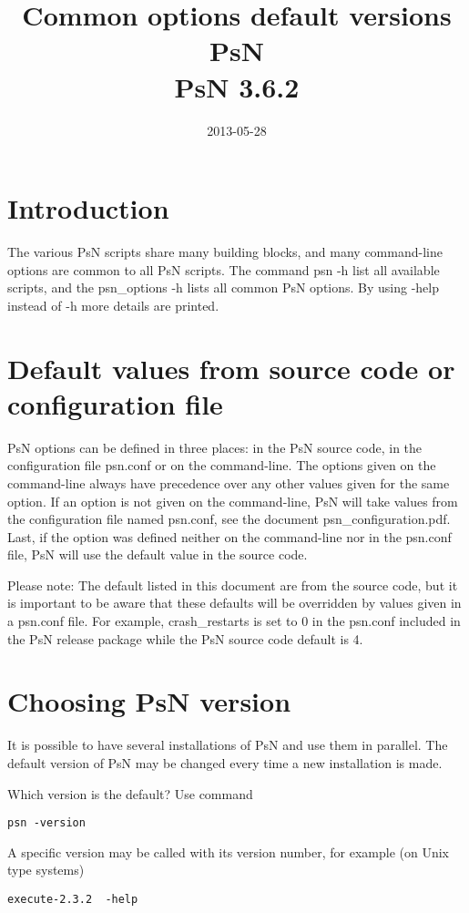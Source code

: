 \documentclass[a4paper,12pt]{article}
\title{Common options default versions PsN\\ \vspace{2 mm} {\large PsN 3.6.2}}
\date{2013-05-28}
\begin{document}
\maketitle

\section{Introduction}
The various PsN scripts share many building blocks, and many command-line options are common to all PsN scripts. The command psn -h list all available scripts, and the psn\_options -h lists all common PsN options. By using -help instead of -h more details are printed. 

\section{Default values from source code or configuration file}
PsN options can be defined in three places: in the PsN source code, in the configuration file psn.conf or on the command-line. The options given on the command-line always have precedence over any other values given for the same option. If an option is not given on the command-line, PsN will take values from the configuration file named psn.conf, see the document psn\_configuration.pdf. Last, if the option was defined neither on the command-line nor in the psn.conf file, PsN will use the default value in the source code. 

Please note: The default listed in this document are from the source code, but it is important to be aware that these defaults will be overridden by values given in a psn.conf file. For example, crash\_restarts is set to 0 in the psn.conf included in the PsN release package while the PsN source code default is 4. 

\section{Choosing PsN version}
It is possible to have several installations of PsN and use them in parallel. The default version of PsN may be changed every time a new installation is made. 

Which version is the default? Use command
\begin{verbatim}
psn -version
\end{verbatim}

A specific version may be called with its version number, for example (on Unix type systems)

\begin{verbatim}
execute-2.3.2  -help 
\end{verbatim}
\end{document}
